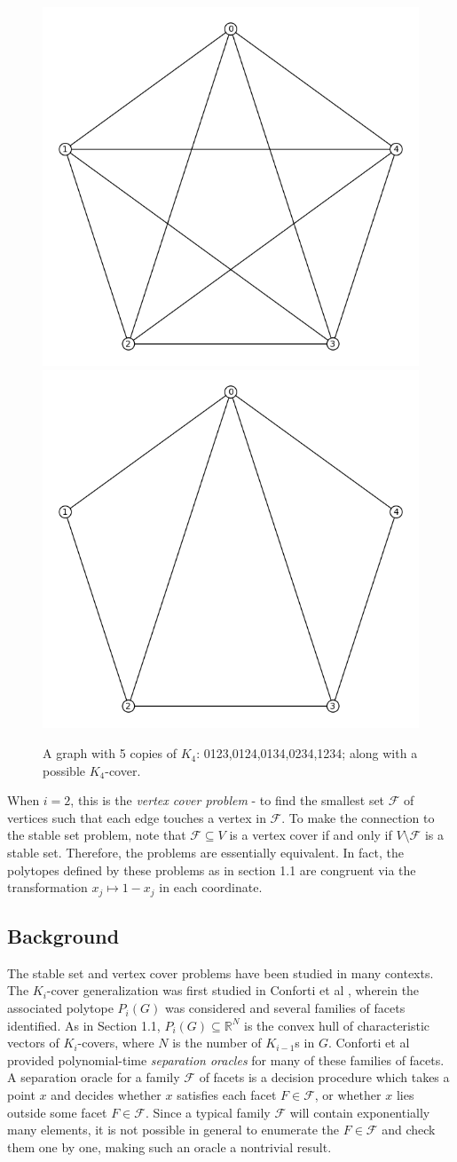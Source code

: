 \begin{figure}[htd]
	\centering
	\includegraphics[width=.4\textwidth,natwidth=613,natheight=584]{K5.png}
	\includegraphics[width=.4\textwidth,natwidth=613,natheight=584]{K4cover.png}
	\caption{A graph with 5 copies of $K_4$: 0123,0124,0134,0234,1234; along with a possible $K_4$-cover.}
	\label{K5}
\end{figure}

When $i=2$, this is the \emph{vertex cover problem} - to find the smallest
set $\mathcal{F}$ of vertices such that each edge touches a vertex in
$\mathcal{F}$. To make the
connection to the stable set problem, note that $\mathcal{F} \subseteq V$ is a vertex
cover if and only if $V \setminus \mathcal{F}$ is a stable set.
Therefore, the problems are essentially equivalent. In fact, the polytopes
defined by these problems as in section 1.1 are congruent via the transformation
$x_j \mapsto 1-x_j$ in each coordinate.

\subsection{Background}

The stable set and vertex cover problems have been studied in many contexts. 
The $K_i$-cover generalization was first studied in Conforti et al 
\cite{conforti}, wherein the associated polytope $P_i(G)$ was 
considered and several families of facets identified. 
As in Section 1.1, $P_i(G) \subseteq \mathbb{R}^N$ is the convex hull of
characteristic vectors of $K_i$-covers, where $N$ is the number of $K_{i-1}$s in
$G$. 
Conforti et al provided polynomial-time {\em separation oracles} for many of these families of facets. 
A separation oracle for a family $\mathcal{F}$ of facets is a decision procedure
which takes a point $x$ and decides whether $x$ satisfies each facet $F \in
\mathcal{F}$, or whether $x$ lies outside some facet $F \in \mathcal{F}$.
Since a typical family $\mathcal{F}$ will contain exponentially many elements, it is not possible in general to enumerate the $F \in \mathcal{F}$ and check them one by one, making such an oracle a nontrivial result.

